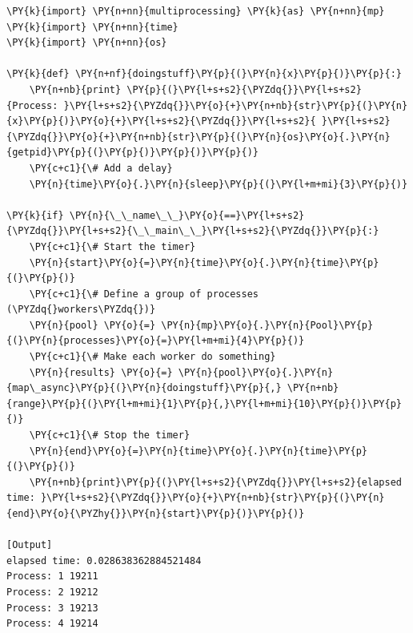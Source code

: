 \begin{Verbatim}[label=\makebox{\url{https://github.com/lucabaldini/cmepda/tree/master/slides/latex/snippets/multiprocessing_pool_doingstuff_async.py}},commandchars=\\\{\}]
\PY{k}{import} \PY{n+nn}{multiprocessing} \PY{k}{as} \PY{n+nn}{mp}
\PY{k}{import} \PY{n+nn}{time}
\PY{k}{import} \PY{n+nn}{os}

\PY{k}{def} \PY{n+nf}{doingstuff}\PY{p}{(}\PY{n}{x}\PY{p}{)}\PY{p}{:}
    \PY{n+nb}{print} \PY{p}{(}\PY{l+s+s2}{\PYZdq{}}\PY{l+s+s2}{Process: }\PY{l+s+s2}{\PYZdq{}}\PY{o}{+}\PY{n+nb}{str}\PY{p}{(}\PY{n}{x}\PY{p}{)}\PY{o}{+}\PY{l+s+s2}{\PYZdq{}}\PY{l+s+s2}{ }\PY{l+s+s2}{\PYZdq{}}\PY{o}{+}\PY{n+nb}{str}\PY{p}{(}\PY{n}{os}\PY{o}{.}\PY{n}{getpid}\PY{p}{(}\PY{p}{)}\PY{p}{)}\PY{p}{)}
    \PY{c+c1}{\# Add a delay}
    \PY{n}{time}\PY{o}{.}\PY{n}{sleep}\PY{p}{(}\PY{l+m+mi}{3}\PY{p}{)}

\PY{k}{if} \PY{n}{\_\_name\_\_}\PY{o}{==}\PY{l+s+s2}{\PYZdq{}}\PY{l+s+s2}{\_\_main\_\_}\PY{l+s+s2}{\PYZdq{}}\PY{p}{:}
    \PY{c+c1}{\# Start the timer}
    \PY{n}{start}\PY{o}{=}\PY{n}{time}\PY{o}{.}\PY{n}{time}\PY{p}{(}\PY{p}{)}
    \PY{c+c1}{\# Define a group of processes (\PYZdq{}workers\PYZdq{})}
    \PY{n}{pool} \PY{o}{=} \PY{n}{mp}\PY{o}{.}\PY{n}{Pool}\PY{p}{(}\PY{n}{processes}\PY{o}{=}\PY{l+m+mi}{4}\PY{p}{)}
    \PY{c+c1}{\# Make each worker do something}
    \PY{n}{results} \PY{o}{=} \PY{n}{pool}\PY{o}{.}\PY{n}{map\_async}\PY{p}{(}\PY{n}{doingstuff}\PY{p}{,} \PY{n+nb}{range}\PY{p}{(}\PY{l+m+mi}{1}\PY{p}{,}\PY{l+m+mi}{10}\PY{p}{)}\PY{p}{)}
    \PY{c+c1}{\# Stop the timer}
    \PY{n}{end}\PY{o}{=}\PY{n}{time}\PY{o}{.}\PY{n}{time}\PY{p}{(}\PY{p}{)}
    \PY{n+nb}{print}\PY{p}{(}\PY{l+s+s2}{\PYZdq{}}\PY{l+s+s2}{elapsed time: }\PY{l+s+s2}{\PYZdq{}}\PY{o}{+}\PY{n+nb}{str}\PY{p}{(}\PY{n}{end}\PY{o}{\PYZhy{}}\PY{n}{start}\PY{p}{)}\PY{p}{)}

[Output]
elapsed time: 0.028638362884521484
Process: 1 19211
Process: 2 19212
Process: 3 19213
Process: 4 19214
\end{Verbatim}